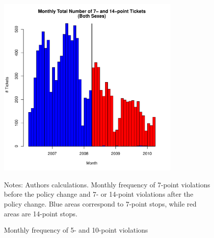 \begin{figure}
\centering
\includegraphics[width=0.8\textwidth]{../Figures/num_pts_7_14_all_orig.pdf}
\caption{Monthly frequency of 5- and 10-point violations }
Notes: Authors calculations. Monthly frequency of 7-point violations before the policy change and 7- or 14-point violations after the policy change. Blue areas correspond to 7-point stops, while red areas are 14-point stops.
\label{fig:num_pts_7_14_all}
\end{figure}



% 


% 





